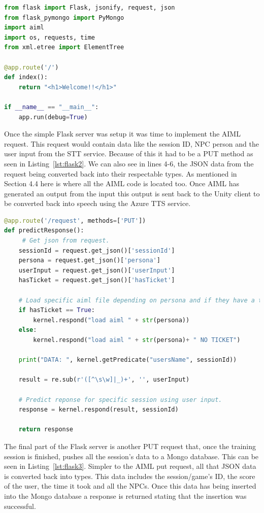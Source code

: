 \begin{lstlisting}[caption={Basic Flask GET request},label={lst:flask1},language=python]
from flask import Flask, jsonify, request, json
from flask_pymongo import PyMongo
import aiml
import os, requests, time
from xml.etree import ElementTree

@app.route('/')
def index():
    return "<h1>Welcome!!</h1>"
    
if __name__ == "__main__":
    app.run(debug=True)
\end{lstlisting}

\medskip
Once the simple Flask server was setup it was time to implement the AIML request. This request would contain data like the session ID, NPC person and the user input from the STT service. Because of this it had to be a PUT method as seen in Listing~\ref{lst:flask2}. We can also see in lines 4-6, the JSON data from the request being converted back into their respectable types. As mentioned in Section 4.4 here is where all the AIML code is located too. Once AIML has generated an output from the input this output is sent back to the Unity client to be converted back into speech using the Azure TTS service. 

\begin{lstlisting}[caption={Flask PUT request to generate AIML response.},label={lst:flask2},language=python]
@app.route('/request', methods=['PUT'])
def predictResponse():
     # Get json from request.
    sessionId = request.get_json()['sessionId']
    persona = request.get_json()['persona']
    userInput = request.get_json()['userInput']
    hasTicket = request.get_json()['hasTicket']

    # Load specific aiml file depending on persona and if they have a ticket.
    if hasTicket == True:
        kernel.respond("load aiml " + str(persona))
    else:
        kernel.respond("load aiml " + str(persona)+ " NO TICKET")
        
    print("DATA: ", kernel.getPredicate("usersName", sessionId))

    result = re.sub(r'([^\s\w]|_)+', '', userInput)

    # Predict reponse for specific session using user input.
    response = kernel.respond(result, sessionId)

    return response
\end{lstlisting}

The final part of the Flask server is another PUT request that, once the training session is finished, pushes all the session's data to a Mongo database. This can be seen in Listing~\ref{lst:flask3}. Simpler to the AIML put request, all that JSON data is converted back into types. This data includes the session/game's ID, the score of the user, the time it took and all the NPCs. Once this data has being inserted into the Mongo database a response is returned stating that the insertion was successful. 

